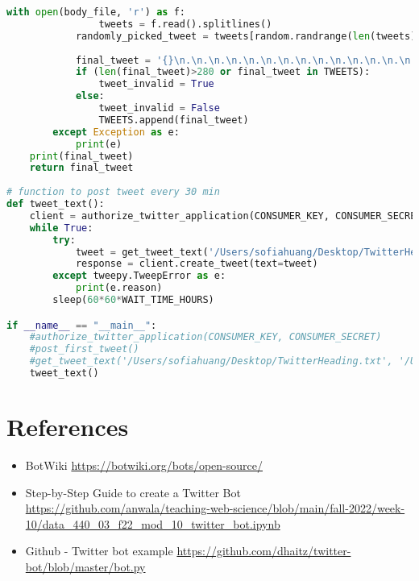 \documentclass[12pt]{article}
\begin{document}
\begin{lstlisting}[language=Python, caption=Twitter bot Python script, label=lst:copy]
            with open(body_file, 'r') as f:
                tweets = f.read().splitlines()
            randomly_picked_tweet = tweets[random.randrange(len(tweets))]
        
            final_tweet = '{}\n.\n.\n.\n.\n.\n.\n.\n.\n.\n.\n.\n.\n.\n.\n.\n.\n.\n.\n.\n.\n.\n.\n.\n.\n.\n.\n.\n.\n.\n.\n.\n.\n.\n.\n.\n.\n.\n.\n.\n.\n.\n.\n.\n.\n.\n.\n.\n.\n.\n.\n.\n.\n.\n.\n.\n.\n.\n.\n.\n.\n.\n.\n.\n.\n.\n.\n.\n.\n.\n.\n.\n.\n.\n.\n.\n.\n.\n.\n.\n.\n.\n.\n.\n.\n.\n.\n.\n.\n.\n.\n.\n.\n.\n.\n.\n.\n.\n.\n.\n.\n.\n.\n.\n.\n.\n.\n.\n.\n.\n.\n.\n.\n.\n.\n.\n.\n.\n.\n.\n.\n.\n.\n{}'.format(randomly_picked_header, randomly_picked_tweet)
            if (len(final_tweet)>280 or final_tweet in TWEETS):
                tweet_invalid = True
            else:
                tweet_invalid = False
                TWEETS.append(final_tweet)
        except Exception as e:
            print(e)
    print(final_tweet)
    return final_tweet
    
# function to post tweet every 30 min
def tweet_text():
    client = authorize_twitter_application(CONSUMER_KEY, CONSUMER_SECRET)
    while True:
        try:
            tweet = get_tweet_text('/Users/sofiahuang/Desktop/TwitterHeading.txt', '/Users/sofiahuang/Desktop/TwitterBody.txt')
            response = client.create_tweet(text=tweet)
        except tweepy.TweepError as e:
            print(e.reason)
        sleep(60*60*WAIT_TIME_HOURS)

if __name__ == "__main__":
    #authorize_twitter_application(CONSUMER_KEY, CONSUMER_SECRET)
    #post_first_tweet()
    #get_tweet_text('/Users/sofiahuang/Desktop/TwitterHeading.txt', '/Users/sofiahuang/Desktop/TwitterBody.txt')
    tweet_text()
\end{lstlisting}

\section*{References}

\begin{itemize}
    \item{BotWiki} \url{https://botwiki.org/bots/open-source/}
    \item{Step-by-Step Guide to create a Twitter Bot}
    \url{https://github.com/anwala/teaching-web-science/blob/main/fall-2022/week-10/data_440_03_f22_mod_10_twitter_bot.ipynb}
    \item{Github - Twitter bot example} \url{https://github.com/dhaitz/twitter-bot/blob/master/bot.py}
\end{itemize}
\end{document}
